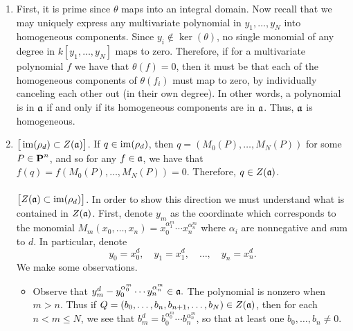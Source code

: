 \documentclass[10pt]{amsart}
\begin{document}
\begin{solution}
    \begin{luke}
        \begin{enumerate}
            \item First, it is prime since $\theta$ maps into an integral domain.
            Now recall that we may uniquely express
            any multivariate polynomial in $y_1, \dots, y_N$ into 
            homogeneous components. Since $y_i \not\in \ker(\theta)$, 
            no single monomial of any degree in $k[y_1, \dots, y_N]$ 
            maps to zero. Therefore, if
            for a multivariate polynomial $f$ we have that $\theta(f) = 0$, 
            then it must be that each 
            of the homogeneous components of $\theta(f_i)$ must map to zero, by 
            individually canceling each other out (in their own degree). 
            In other words, a polynomial is in $\mathfrak{a}$
            if and only if its homogeneous components are in $\mathfrak{a}$. 
            Thus, $\mathfrak{a}$ is homogeneous. 

            \item ${\big[}\operatorname{im}(\rho_d) \subset Z(\mathfrak{a}){\big]}$. 
            If $q \in \operatorname{im}(\rho_d)$, then $q = (M_0(P), \dots, M_N(P))$ for some $P \in \operatorname{\mathbf{P}}^n$, 
            and so for any $f \in \mathfrak{a}$, we have that $f(q) = f(M_0(P), \dots, M_N(P)) = 0.$
            Therefore, $q \in Z(\mathfrak{a})$.
            \\
            \\
            \noindent ${\big[}Z(\mathfrak{a}) \subset \operatorname{im}(\rho_d){\big]}$. 
            In order to show this direction we must understand what is contained in $Z(\mathfrak{a})$. 
            First, denote $y_m$ as the coordinate which corresponds to the monomial 
            $M_m(x_0, \dots, x_n) = x_0^{\alpha_1^m} \cdots x_n^{\alpha_n^{m}}$ where $\alpha_i$ are nonnegative and 
            sum to $d$. In particular, denote
            \[
                y_0 = x_0^d, \quad y_1 = x_1^d, \quad \dots, \quad y_n = x_n^{d}.
            \]
            We make some observations. 
            \begin{itemize}
                \item Observe that $y_m^d - y_0^{\alpha_0^m} \cdots y_n^{\alpha_n^{m}} \in \mathfrak{a}.$
                The polynomial is nonzero when $m > n$. 
                Thus if $ Q = (b_0, \dots, b_n, b_{n+1}, \dots, b_{N}) \in Z(\mathfrak{a})$, then for each $n < m \le N$, we see that 
                $b_m^d = b_0^{\alpha_0^m} \cdots b_n^{\alpha_n^{m}}$, so that at least one $b_0, \dots, b_n \ne 0$.


\end{itemize}
\end{enumerate}
\end{luke}
\end{solution}
\end{document}
